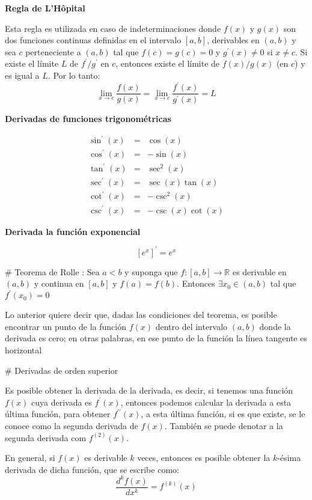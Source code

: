 \documentclass[
  letterpaper,
  DIV=11,
  numbers=noendperiod]{scrreprt}
\begin{document}
\textbf{Regla de L'Hôpital}

Esta regla es utilizada en caso de indeterminaciones donde \(f(x)\) y
\(g(x)\) son dos funciones continuas definidas en el intervalo
\([a,b]\), derivables en \((a,b)\) y sea \(c\) perteneciente a \((a,b)\)
tal que \(f(c)=g(c)=0\) y \(g^\prime(x) \neq 0\) si \(x \neq c\). Si
existe el límite \(L\) de \(f^\prime/g^\prime\) en \(c\), entonces
existe el límite de \(f(x)/g(x)\) (en \(c\)) y es igual a \(L\). Por lo
tanto: \[ 
\lim_{x \to c} \frac{f(x)}{g(x)} = \lim_{x \to c} \frac{f^\prime(x)}{g^\prime(x)} = L 
\]

\textbf{Derivadas de funciones trigonométricas}

\[
\begin{eqnarray}
\sin^\prime(x) & = & \cos(x) \\ 
\cos^\prime(x) & = & -\sin(x) \\
\tan^\prime(x) & = & \sec^2(x) \\
\sec^\prime(x) & = & \sec(x)\tan(x) \\
\cot^\prime(x) & = & -\csc^2(x) \\
\csc^\prime(x) & = & -\csc(x)\cot(x)
\end{eqnarray}
\]

\textbf{Derivada la función exponencial}

\[
\left[ e^{x} \right]^\prime = e^{x}
\]

\# Teorema de Rolle : Sea \(a < b\) y suponga que
\(f : [a, b] → {\mathbb{R}}\) es derivable en \((a, b)\) y continua en
\([a, b]\) y \(f(a) = f(b)\). Entonces \(∃ x_0 ∈ (a, b)\) tal que
\(f^\prime(x_0) = 0\)

Lo anterior quiere decir que, dadas las condiciones del teorema, es
posible encontrar un punto de la función \(f(x)\) dentro del intervalo
\((a,b)\) donde la derivada es cero; en otras palabras, en ese punto de
la función la línea tangente es horizontal

\# Derivadas de orden superior

Es posible obtener la derivada de la derivada, es decir, si tenemos una
función \(f(x)\) cuya derivada es \(f^\prime(x)\), entonces podemos
calcular la derivada a esta última función, para obtener
\(f^{\prime\prime}(x)\), a esta última función, si es que existe, se le
conoce como la segunda derivada de \(f(x)\). También se puede denotar a
la segunda derivada com \(f^{(2)}(x)\).

En general, si \(f(x)\) es derivable \(k\) veces, entonces es posible
obtener la \(k\)-ésima derivada de dicha función, que se escribe como:
\[ 
\frac{d^kf(x)}{dx^k} = f^{(k)}(x)
\]
\end{document}
